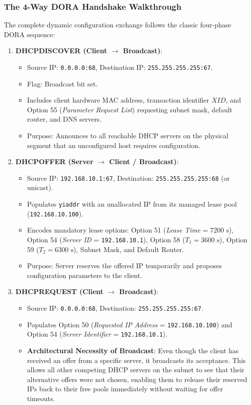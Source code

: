 \documentclass[12pt, a4paper]{article}
\begin{document}
\subsubsection{The 4-Way DORA Handshake Walkthrough}
The complete dynamic configuration exchange follows the classic four-phase DORA sequence:
\begin{enumerate}
    \item \textbf{DHCPDISCOVER (Client $\to$ Broadcast)}:
    \begin{itemize}
        \item Source IP: \texttt{0.0.0.0:68}, Destination IP: \texttt{255.255.255.255:67}.
        \item Flag: Broadcast bit set.
        \item Includes client hardware MAC address, transaction identifier $XID$, and Option 55 (\textit{Parameter Request List}) requesting subnet mask, default router, and DNS servers.
        \item Purpose: Announces to all reachable DHCP servers on the physical segment that an unconfigured host requires configuration.
    \end{itemize}

    \item \textbf{DHCPOFFER (Server $\to$ Client / Broadcast)}:
    \begin{itemize}
        \item Source IP: \texttt{192.168.10.1:67}, Destination: \texttt{255.255.255.255:68} (or unicast).
        \item Populates \texttt{yiaddr} with an unallocated IP from its managed lease pool (\texttt{192.168.10.100}).
        \item Encodes mandatory lease options: Option 51 (\textit{Lease Time} = $7200\text{ s}$), Option 54 (\textit{Server ID} = \texttt{192.168.10.1}), Option 58 ($T_1 = 3600\text{ s}$), Option 59 ($T_2 = 6300\text{ s}$), Subnet Mask, and Default Router.
        \item Purpose: Server reserves the offered IP temporarily and proposes configuration parameters to the client.
    \end{itemize}

    \item \textbf{DHCPREQUEST (Client $\to$ Broadcast)}:
    \begin{itemize}
        \item Source IP: \texttt{0.0.0.0:68}, Destination: \texttt{255.255.255.255:67}.
        \item Populates Option 50 (\textit{Requested IP Address} = \texttt{192.168.10.100}) and Option 54 (\textit{Server Identifier} = \texttt{192.168.10.1}).
        \item \textbf{Architectural Necessity of Broadcast}: Even though the client has received an offer from a specific server, it broadcasts its acceptance. This allows all other competing DHCP servers on the subnet to see that their alternative offers were not chosen, enabling them to release their reserved IPs back to their free pools immediately without waiting for offer timeouts.
    \end{itemize}


\end{enumerate}
\end{document}
